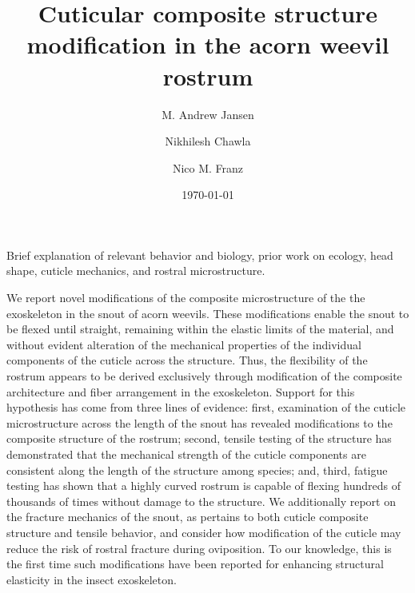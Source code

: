 \documentclass[twocolumn, linenumbers, superscriptaddress]{revtex4-1}
\begin{document}
	\begin{abstract}
		\blindtext
	\end{abstract}
	
	{\title{Cuticular composite structure modification in the acorn weevil rostrum}
	
	\date{\today}
	
	\author{M. Andrew Jansen}
	\author{Nikhilesh Chawla}
	\author{Nico M. Franz}
		
	\maketitle
	}
	
	Brief explanation of relevant behavior and biology, prior work on ecology, head shape, cuticle mechanics, and rostral microstructure.
	
		We report novel modifications of the composite microstructure of the the exoskeleton in the snout of acorn weevils.
	These modifications enable the snout to be flexed until straight, remaining within the elastic limits of the material, and without evident alteration of the mechanical properties of the individual components of the cuticle across the structure.
	Thus, the flexibility of the rostrum appears to be derived exclusively through modification of the composite architecture and fiber arrangement in the exoskeleton.
	Support for this hypothesis has come from three lines of evidence: first, examination of the cuticle microstructure across the length of the snout has revealed modifications to the composite structure of the rostrum; second, tensile testing of the structure has demonstrated that the mechanical strength of the cuticle components are consistent along the length of the structure among species; and, third, fatigue testing has shown that a highly curved rostrum is capable of flexing hundreds of thousands of times without damage to the structure.
	We additionally report on the fracture mechanics of the snout, as pertains to both cuticle composite structure and tensile behavior, and consider how modification of the cuticle may reduce the risk of rostral fracture during oviposition.
	To our knowledge, this is the first time such modifications have been reported for enhancing structural elasticity in the insect exoskeleton.
	\lipsum
\end{document}
